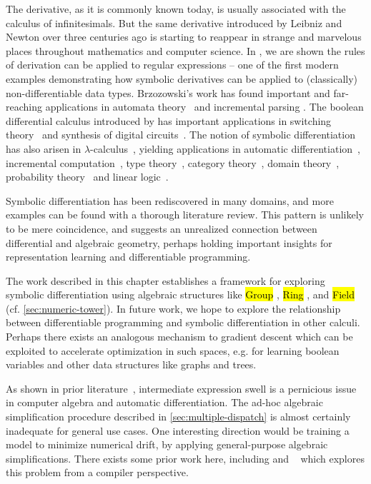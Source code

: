\documentclass[12pt,initial,twoside,maitrise]{dms}
\newcommand{\inline}[1]{%
    \begingroup%
    \sethlcolor{slightgray}%
    \hl{\ttfamily\small #1}%
    \endgroup
}
\numberwithin{equation}{section}
\numberwithin{table}{chapter}
\numberwithin{figure}{chapter}
\begin{document}
The derivative, as it is commonly known today, is usually associated with the calculus of infinitesimals. But the same derivative introduced by Leibniz and Newton over three centuries ago is starting to reappear in strange and marvelous places throughout mathematics and computer science. In \citet{brzozowski1964derivatives}, we are shown the rules of derivation can be applied to regular expressions -- one of the first modern examples demonstrating how symbolic derivatives can be applied to (classically) non-differentiable data types. Brzozowski's work has found important and far-reaching applications in automata theory~\citep{berry1986regex, antimirov1996partial, champarnaud1999regular} and incremental parsing \citep{might2011parsing, moss2014derivatives}. The boolean differential calculus introduced by \citet{thayse1981boolean} has important applications in switching theory~\citep{thayse1973boolean} and synthesis of digital circuits~\citep{steinbach2017boolean}. The notion of symbolic differentiation has also arisen in $\lambda$-calculus~\citep{ehrhard2003differential}, yielding applications in automatic differentiation~\citep{kelly2016evolving}, incremental computation~\citep{cai2014theory, alvarezpicallo2019fixing}, type theory~\citep{mcbride2001derivative, mcbride2008clowns, chen2012type}, category theory~\citep{blute2006differential, blute2009cartesian}, domain theory~\citep{edalat2002domain}, probability theory~\citep{kac1951probability} and linear logic~\citep{ehrhard2018introduction, clift2018derivatives}.

Symbolic differentiation has been rediscovered in many domains, and more examples can be found with a thorough literature review. This pattern is unlikely to be mere coincidence, and suggests an unrealized connection between differential and algebraic geometry, perhaps holding important insights for representation learning and differentiable programming.

The work described in this chapter establishes a framework for exploring symbolic differentiation using algebraic structures like \inline{Group}, \inline{Ring}, and \inline{Field} (cf. \autoref{sec:numeric-tower}). In future work, we hope to explore the relationship between differentiable programming and symbolic differentiation in other calculi. Perhaps there exists an analogous mechanism to gradient descent which can be exploited to accelerate optimization in such spaces, e.g. for learning boolean variables and other data structures like graphs and trees.

As shown in prior literature~\citep{theano, baydin-survey, laue2019equivalence}, intermediate expression swell is a pernicious issue in computer algebra and automatic differentiation. The ad-hoc algebraic simplification procedure described in \autoref{sec:multiple-dispatch} is almost certainly inadequate for general use cases. One interesting direction would be training a model to minimize numerical drift, by applying general-purpose algebraic simplifications. There exists some prior work here, including \citet{zaremba2014learning, zaremba2016learning} and ~\citet{wang2019global} which explores this problem from a compiler perspective.
\end{document}
